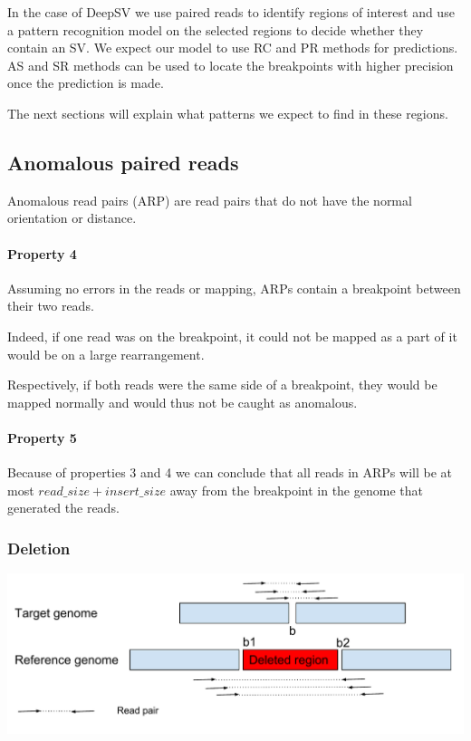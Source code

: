 \documentclass{article}
\begin{document}
In the case of DeepSV we use paired reads to identify regions of interest and use a pattern recognition model on the selected regions to decide whether they contain an SV.
We expect our model to use RC and PR methods for predictions. AS and SR methods can be used to locate the breakpoints with higher precision once the prediction is made.

The next sections will explain what patterns we expect to find in these regions.

\subsection{Anomalous paired reads}

Anomalous read pairs (ARP) are read pairs that do not have the normal orientation or distance.

\paragraph{Property 4}  Assuming no errors in the reads or mapping, ARPs contain a breakpoint between their two reads.

Indeed, if one read was on the breakpoint, it could not be mapped as a part of it would be on a large rearrangement.

Respectively, if both reads were the same side of a  breakpoint, they would be mapped normally and would
thus not be caught as anomalous.

\paragraph{Property 5} Because of properties 3 and 4 we can conclude that all reads in ARPs will be at most $read\_size + insert\_size$ away from the breakpoint in the genome that generated the reads.

\subsubsection{Deletion}

\includegraphics[width=\textwidth]{DeletionReadPairs}
\end{document}
